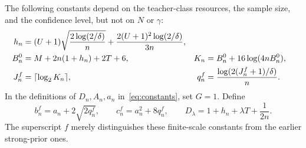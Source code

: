 The following constants depend on the teacher-class resources, the sample size, and the confidence level, but not on $N$ or $\gamma$:
\begin{align}
 h_n&=(U+1)\sqrt{\frac{2\log(2/\delta)}n}
             +\frac{2(U+1)^2\log(2/\delta)}{3n},\notag\\
 B_n^0&=M+2n(1+h_n)+2T+6,
 & K_n&=B_n^0+16\log(4nB_n^0),\notag\\
 J_n^f&=\lceil\log_2K_n\rceil,
 &q_n^f&=\frac{\log(2(J_n^f+1)/\delta)}n.\notag
\end{align}
In the definitions of $D_n,A_n,a_n$ in~\eqref{eq:constants}, set $G=1$. Define
\begin{equation}
 b_n^f=a_n+2\sqrt{2q_n^f},\qquad
 c_n^f=a_n^2+8q_n^f,\qquad
 D_\lambda=1+h_n+\lambda T+\frac1{2n}.
 \label{eq:finite-statistical-constants}
\end{equation}
The superscript $f$ merely distinguishes these finite-scale constants from the earlier strong-prior ones.

